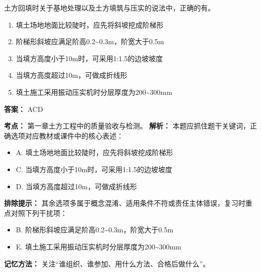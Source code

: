\documentclass[UTF8,fontset=fandol,11pt]{ctexart}
\begin{document}
\begin{quizbox}[title={第 19 题}]
土方回填时关于基地处理以及土方填筑与压实的说法中，正确的有。\\
\begin{enumerate}[label=\Alph*.]
\item 填土场地地面比较陡时，应先将斜坡挖成阶梯形
\item 阶梯形斜坡应满足阶高0.2\textasciitilde{}0.3m，阶宽大于0.5m
\item 当填方高度小于10m时，可采用1:1.5的边坡坡度
\item 当填方高度超过10m，可做成折线形
\item 填土施工采用振动压实机时分层厚度为200\textasciitilde{}300mm
\end{enumerate}
\textbf{答案：} ACD
\vspace{0.25em}
\begin{answerbox}[title={考点解析}]
\textbf{考点：} 第一章土方工程中的质量验收与检测。
\textbf{解析：} 本题应抓住题干关键词，正确选项对应教材或课件中的核心表述：
\begin{itemize}
\item A. 填土场地地面比较陡时，应先将斜坡挖成阶梯形
\item C. 当填方高度小于10m时，可采用1:1.5的边坡坡度
\item D. 当填方高度超过10m，可做成折线形
\end{itemize}
\textbf{排除提示：} 其余选项多属于概念混淆、适用条件不符或责任主体错误，复习时重点对照下列干扰项：
\begin{itemize}
\item B. 阶梯形斜坡应满足阶高0.2\textasciitilde{}0.3m，阶宽大于0.5m
\item E. 填土施工采用振动压实机时分层厚度为200\textasciitilde{}300mm
\end{itemize}
\textbf{记忆方法：} 关注“谁组织、谁参加、用什么方法、合格后做什么”。
\end{answerbox}
\end{quizbox}
\end{document}
